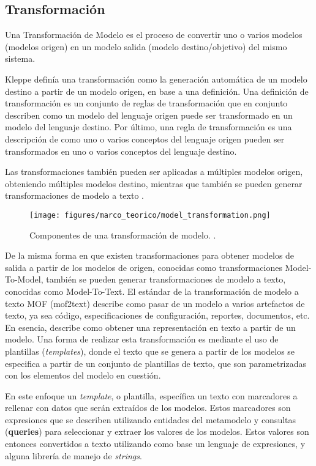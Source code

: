 \subsection{Transformación}
Una Transformación de Modelo es el proceso de convertir uno o varios modelos (modelos origen) en un modelo salida (modelo destino/objetivo) del mismo sistema.

Kleppe \cite{kleppe2003mda} definía una transformación como la generación automática de un modelo destino a partir de un modelo origen, en base a una definición. Una definición de transformación es un conjunto de reglas de transformación que en conjunto describen como un modelo del lenguaje origen puede ser transformado en un modelo del lenguaje destino. Por último, una regla de transformación es una descripción de como uno o varios conceptos del lenguaje origen pueden ser transformados en uno o varios conceptos del lenguaje destino.

Las transformaciones también pueden ser aplicadas a múltiples modelos origen, obteniendo múltiples modelos destino, mientras que también se pueden generar transformaciones de modelo a texto \cite{mens2006taxonomy}.

\begin{figure}[htbp]
    \centering
    \texttt{[image: figures/marco\_teorico/model\_transformation.png]}
    \caption{Componentes de una transformación de modelo. \cite{biehl2010literature}.}
    \label{fig:marco:transformation}
\end{figure}

De la misma forma en que existen transformaciones para obtener modelos de salida a partir de los modelos de origen, conocidas como transformaciones Model-To-Model, también se pueden generar transformaciones de modelo a texto, conocidas como Model-To-Text. El estándar de la transformación de modelo a texto MOF (mof2text) describe como pasar de un modelo a varios artefactos de texto, ya sea código, especificaciones de configuración, reportes, documentos, etc. En esencia, describe como obtener una representación en texto a partir de un modelo. Una forma de realizar esta transformación es mediante el uso de plantillas (\textit{templates}), donde el texto que se genera a partir de los modelos se especifica a partir de un conjunto de plantillas de texto, que son parametrizadas con los elementos del modelo en cuestión.

En este enfoque un \textit{template}, o plantilla, específica un texto con marcadores a rellenar con datos que serán extraídos de los modelos. Estos marcadores son expresiones que se describen utilizando entidades del metamodelo y consultas (\textbf{queries}) para seleccionar y extraer los valores de los modelos. Estos valores son entonces convertidos a texto utilizando como base un lenguaje de expresiones, y alguna librería de manejo de \textit{strings}. \cite{mof_model2text}

